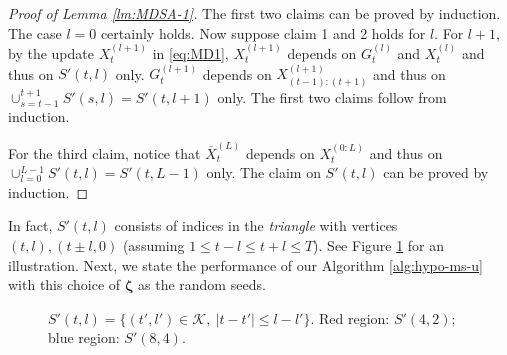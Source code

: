 \documentclass[11pt,fullpage,letterpaper]{article}
\newcommand{\mc}{\mathcal}
\newcommand{\bz}{\boldsymbol{\zeta}}
\begin{document}
\begin{proof}[Proof of Lemma \ref{lm:MDSA-1}]
The first two claims can be proved by induction. The case $l=0$ certainly holds. Now suppose claim 1 and 2 holds for $l$. For $l+1$, by the update $X_t^{(l+1)}$ in \eqref{eq:MD1}, $X_t^{(l+1)}$ depends on $G_t^{(l)}$ and $X_t^{(l)}$ and thus on $S'(t,l)$ only. $G_t^{(l+1)}$ depends on $X_{(t-1):(t+1)}^{(l+1)}$ and thus on $\cup_{s=t-1}^{t+1}S'(s,l)=S'(t,l+1)$ only. The first two claims follow from induction. 

For the third claim, notice that $\overline{X}_t^{(L)}$ depends on $X_t^{(0:L)}$ and thus on $\cup_{l=0}^{L-1}S'(t,l)=S'(t,L-1)$ only. The claim on $S'(t,l)$ can be proved by induction. 
\end{proof}

In fact, $S'(t,l)$ consists of indices in the \textit{triangle} with vertices $(t,l),(t\pm l,0)$ (assuming $1\leq t-l\leq t+l\leq T$). See Figure \ref{fig:S-fig} for an illustration. Next, we state the performance of our Algorithm \ref{alg:hypo-ms-u} with this choice of $\bz$ as the random seeds. 


\begin{figure}[h!]
    \centering
    \caption{$S'(t,l) = \{(t',l')\in \mc K,~|t-t'|\leq l-l'\}$. Red region: $S'(4,2)$; blue region: $S'(8,4)$.}
    \label{fig:S-fig}
\end{figure}
\end{document}
